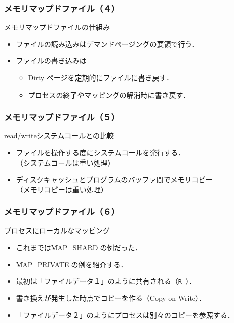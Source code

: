 \documentclass{beamer}                   %
\begin{document}
\begin{frame}
  \frametitle{メモリマップドファイル（４）}
  メモリマップドファイルの仕組み
  \begin{itemize}
  \item ファイルの読み込みはデマンドページングの要領で行う．
  \item ファイルの書き込みは
    \begin{itemize}
      \item Dirty ページを定期的にファイルに書き戻す．
      \item プロセスの終了やマッピングの解消時に書き戻す．
    \end{itemize}
  \end{itemize}
\end{frame}

\begin{frame}
  \frametitle{メモリマップドファイル（５）}
  read/writeシステムコールとの比較
  \begin{itemize}
  \item ファイルを操作する度にシステムコールを発行する．\\
    （システムコールは重い処理）
  \item ディスクキャッシュとプログラムのバッファ間でメモリコピー\\
    （メモリコピーは重い処理）
  \end{itemize}
\end{frame}

\begin{frame}[fragile]
  \frametitle{メモリマップドファイル（６）}
  プロセスにローカルなマッピング
  \begin{itemize}
  \item これまでは\|MAP_SHARD|の例だった．
  \item \|MAP_PRIVATE|の例を紹介する．
  \item 最初は「ファイルデータ１」のように共有される（\texttt{R--}）．
  \item 書き換えが発生した時点でコピーを作る（Copy on Write）．
  \item 「ファイルデータ２」のようにプロセスは別々のコピーを参照する．
  \end{itemize}
\end{frame}
\end{document}
